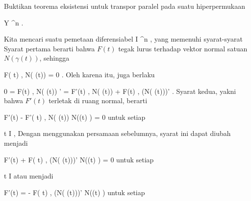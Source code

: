 {

Buktikan teorema eksistensi untuk transpor paralel pada suatu hiperpermukaan

\mavergleichskette
{\vergleichskette
{ Y
}
{ \subseteq }{ \R^n
}
{  }{
}
{    }{
}
{   }{
}
}
{}{}{.}

}
{

Kita mencari suatu pemetaan diferensiabel
 { I } { \R^n
} {,}
yang memenuhi syarat-syarat
Syarat pertama berarti bahwa $F(t)$ tegak lurus terhadap vektor normal satuan $N (\gamma(t))$, sehingga

\mavergleichskettedisp
{\vergleichskette
{ \left\langle F( t) , N( \gamma(t)) \right\rangle
}
{ =} { 0
}
{ } {
}
{ } {
}
{ } {
}
}
{}{}{.}
Oleh karena itu, juga berlaku

\mavergleichskettedisp
{\vergleichskette
{ 0
}
{ =} { \left\langle F(t) , N( \gamma(t)) \right\rangle'
}
{ =} { \left\langle F'(t) , N( \gamma(t)) \right\rangle + \left\langle F(t) , (N( \gamma(t)))' \right\rangle
}
{ } {
}
{ } {
}
}
{}{}{.}
Syarat kedua, yakni bahwa $F'(t)$ terletak di ruang normal, berarti

\mavergleichskettedisp
{\vergleichskette
{ F'(t) - \left\langle F'( t) , N( \gamma(t)) \right\rangle N(\gamma(t) )
}
{ =} { 0
}
{ } {
}
{ } {
}
{ } {
}
}
{}{}{}
untuk setiap

\mavergleichskette
{\vergleichskette
{ t
}
{ \in }{ I
}
{  }{
}
{    }{
}
{   }{
}
}
{}{}{,}
Dengan menggunakan persamaan sebelumnya, syarat ini dapat diubah menjadi

\mavergleichskettedisp
{\vergleichskette
{ F'(t) + \left\langle F( t) , (N( \gamma(t)))' \right\rangle N(\gamma(t) )
}
{ =} { 0
}
{ } {
}
{ } {
}
{ } {
}
}
{}{}{}
untuk setiap

\mavergleichskette
{\vergleichskette
{ t
}
{ \in }{ I
}
{  }{
}
{    }{
}
{   }{
}
}
{}{}{}
atau menjadi

\mavergleichskettedisp
{\vergleichskette
{ F'(t)
}
{ =} { - \left\langle F( t) ,  (N( \gamma(t)))'   \right\rangle N(\gamma(t) )
}
{ } {
}
{ } {
}
{ } {
}
}
{}{}{}
untuk setiap

}

